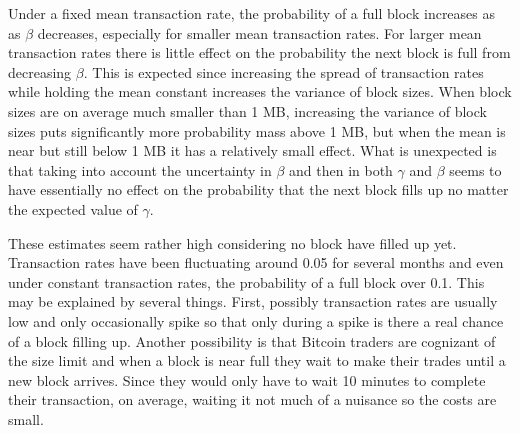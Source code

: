 \documentclass{article}
\begin{document}
Under a fixed mean transaction rate, the probability of a full block increases as as $\beta$ decreases, especially for smaller mean transaction rates. For larger mean transaction rates there is little effect on the probability the next block is full from decreasing $\beta$. This is expected since increasing the spread of transaction rates while holding the mean constant increases the variance of block sizes. When block sizes are on average much smaller than 1 MB, increasing the variance of block sizes puts significantly more probability mass above 1 MB, but when the mean is near but still below 1 MB it has a relatively small effect. What is unexpected is that taking into account the uncertainty in $\beta$ and then in both $\gamma$ and $\beta$ seems to have essentially no effect on the probability that the next block fills up no matter the expected value of $\gamma$.

These estimates seem rather high considering no block have filled up yet. Transaction rates have been fluctuating around 0.05 for several months and even under constant transaction rates, the probability of a full block over 0.1. This may be explained by several things. First, possibly transaction rates are usually low and only occasionally spike so that only during a spike is there a real chance of a block filling up. Another possibility is that Bitcoin traders are cognizant of the size limit and when a block is near full they wait to make their trades until a new block arrives. Since they would only have to wait 10 minutes to complete their transaction, on average, waiting it not much of a nuisance so the costs are small.
\end{document}
